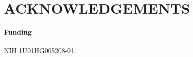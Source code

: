\documentclass{bioinfo}
\begin{document}
\section*{ACKNOWLEDGEMENTS}

\paragraph{Funding\textcolon} NIH 1U01HG005208-01.

\end{document}
